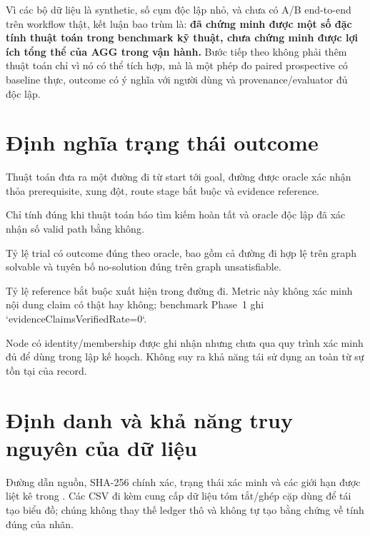 \documentclass[11pt,a4paper]{article}
\begin{document}
Vì các bộ dữ liệu là synthetic, số cụm độc lập nhỏ, và chưa có A/B end-to-end trên workflow thật, kết luận bao trùm là: \textbf{đã chứng minh được một số đặc tính thuật toán trong benchmark kỹ thuật, chưa chứng minh được lợi ích tổng thể của AGG trong vận hành.} Bước tiếp theo không phải thêm thuật toán chỉ vì nó có thể tích hợp, mà là một phép đo paired prospective có baseline thực, outcome có ý nghĩa với người dùng và provenance/evaluator đủ độc lập.

\appendix
\section{Định nghĩa trạng thái outcome}
\begin{description}[style=nextline,leftmargin=2.0em]
\item[Goal-path success] Thuật toán đưa ra một đường đi từ start tới goal, đường được oracle xác nhận thỏa prerequisite, xung đột, route stage bắt buộc và evidence reference.
\item[Correct no-solution] Chỉ tính đúng khi thuật toán báo tìm kiếm hoàn tất và oracle độc lập đã xác nhận số valid path bằng không.
\item[Task-outcome accuracy] Tỷ lệ trial có outcome đúng theo oracle, bao gồm cả đường đi hợp lệ trên graph solvable và tuyên bố no-solution đúng trên graph unsatisfiable.
\item[Evidence coverage] Tỷ lệ reference bắt buộc xuất hiện trong đường đi. Metric này không xác minh nội dung claim có thật hay không; benchmark Phase~1 ghi `evidenceClaimsVerifiedRate=0`.
\item[Unverified reuse] Node có identity/membership được ghi nhận nhưng chưa qua quy trình xác minh đủ để dùng trong lập kế hoạch. Không suy ra khả năng tái sử dụng an toàn từ sự tồn tại của record.
\end{description}

\section{Định danh và khả năng truy nguyên của dữ liệu}
Đường dẫn nguồn, SHA-256 chính xác, trạng thái xác minh và các giới hạn được liệt kê trong . Các CSV đi kèm cung cấp dữ liệu tóm tắt/ghép cặp dùng để tái tạo biểu đồ; chúng không thay thế ledger thô và không tự tạo bằng chứng về tính đúng của nhãn.

\printbibliography[title={Tài liệu tham khảo}]
\end{document}
